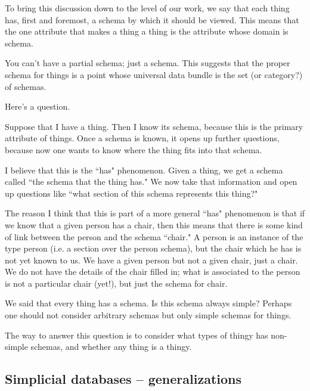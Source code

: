 \documentclass{amsart}
\begin{document}
To bring this discussion down to the level of our work, we say that each thing has, first and foremost, a schema by which it should be viewed.  This means that the one attribute that makes a thing a thing is the attribute whose domain is schema.  

You can't have a partial schema; just a schema.  This suggests that the proper schema for things is a point whose universal data bundle is the set (or category?) of schemas.

Here's a question.

\begin{question} 

Suppose that I have a thing.  Then I know its schema, because this is the primary attribute of things.  Once a schema is known, it opens up further questions, because now one wants to know where the thing fits into that schema.

I believe that this is the ``has" phenomenon.  Given a thing, we get a schema called ``the schema that the thing has."  We now take that information and open up questions like ``what section of this schema represents this thing?"  

The reason I think that this is part of a more general ``has" phenomenon is that if we know that a given person has a chair, then this means that there is some kind of link between the person and the schema ``chair."  A person is an instance of the type person (i.e. a section over the person schema), but the chair which he has is not yet known to us.  We have a given person but not a given chair, just a chair.  We do not have the details of the chair filled in; what is associated to the person is not a particular chair (yet!), but just the schema for chair.

\end{question}

\begin{question}

We said that every thing has a schema.  Is this schema always simple?  Perhaps one should not consider arbitrary schemas but only simple schemas for things.  

The way to answer this question is to consider what types of thingy has non-simple schemas, and whether any thing is a thingy.

\end{question}

\subsection{Simplicial databases -- generalizations}
\end{document}
